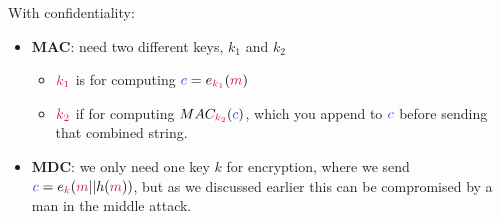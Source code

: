     With confidentiality:
    \begin{itemize}
        \item \textbf{MAC}: need two different keys, $k_{1}$ and $k_{2}$
        \begin{itemize}
            \item $\csubk{1}$ is for computing $\cc = e_{\csubk{1}}(\cm)$
            \item $\csubk{2}$ if for computing $MAC_{\csubk{2}}(\cc)$, which you append to $\cc$ before sending that combined string.
        \end{itemize}
        \item \textbf{MDC}: we only need one key $k$ for encryption, where we send $\cc = e_{\ck}(\cm||h(\cm))$, but as we discussed earlier this can be compromised by a man in the middle attack.
    \end{itemize}
